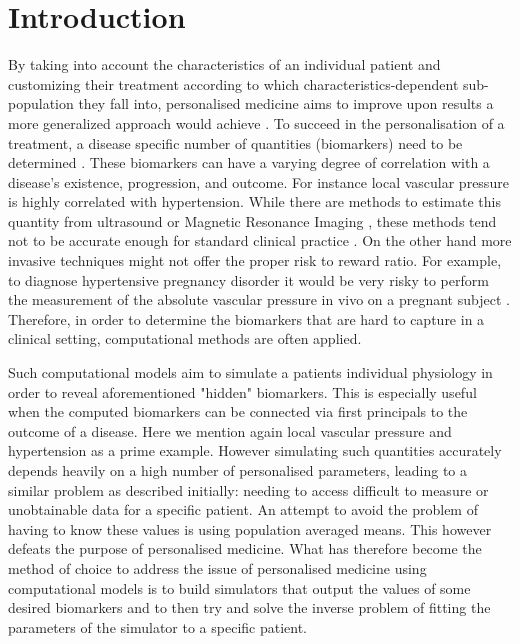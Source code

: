 \documentclass[a4paper, oneside]{discothesis}
\begin{document}
\tableofcontents

\mainmatter %

\chapter{Introduction}
By taking into account the characteristics of an individual patient and customizing their treatment according to which characteristics-dependent sub-population they fall into, personalised medicine aims to improve upon results a more generalized approach would achieve \cite{ashley2016towards,national2011toward,giardino2017role}.
To succeed in the personalisation of a treatment, a disease specific number of quantities (biomarkers) need to be determined \cite{burke1998integrating}.
These biomarkers can have a varying degree of correlation with a disease's existence, progression, and outcome.
For instance local vascular pressure is highly correlated with hypertension.
While there are methods to estimate this quantity from ultrasound or Magnetic Resonance Imaging \cite{markl20124d}, these methods tend not to be accurate enough for standard clinical practice \cite{everett2012beyond}.
On the other hand more invasive techniques might not offer the proper risk to reward ratio.
For example, to diagnose hypertensive pregnancy disorder it would be very risky to perform the measurement of the absolute vascular pressure in vivo on a pregnant subject \cite{kett2002adverse}.
Therefore, in order to determine the biomarkers that are hard to capture in a clinical setting, computational methods are often applied.

Such computational models aim to simulate a patients individual physiology in order to reveal aforementioned "hidden" biomarkers.
This is especially useful when the computed biomarkers can be connected via first principals to the outcome of a disease.
Here we mention again local vascular pressure and hypertension as a prime example.
However simulating such quantities accurately depends heavily on a high number of personalised parameters, leading to a similar problem as described initially: needing to access difficult to measure or unobtainable data for a specific patient.
An attempt to avoid the problem of having to know these values is using population averaged means.
This however defeats the purpose of personalised medicine.
What has therefore become the method of choice to address the issue of personalised medicine using computational models is to build simulators that output the values of some desired biomarkers and to then try and solve the inverse problem of fitting the parameters of the simulator to a specific patient.
\end{document}
